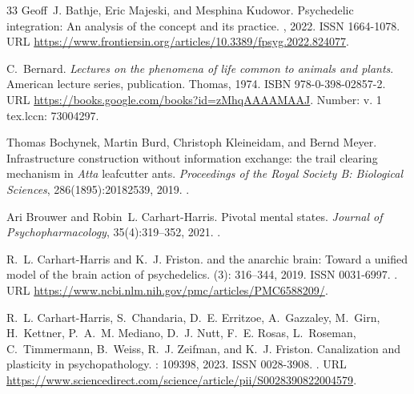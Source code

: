 \documentclass[12pt,fleqn]{article}
\begin{document}
\begin{thebibliography}{33}
  Geoff~J. Bathje, Eric Majeski, and Mesphina Kudowor.
  \newblock Psychedelic integration: An analysis of the concept and its practice.
  , 2022.
  \newblock ISSN 1664-1078.
  \newblock URL
  \url{https://www.frontiersin.org/articles/10.3389/fpsyg.2022.824077}.

  C.~Bernard.
  \newblock \emph{Lectures on the phenomena of life common to animals and
    plants}.
  \newblock American lecture series, publication. Thomas, 1974.
  \newblock ISBN 978-0-398-02857-2.
  \newblock URL \url{https://books.google.com/books?id=zMhqAAAAMAAJ}.
  \newblock Number: v. 1 tex.lccn: 73004297.

  Thomas Bochynek, Martin Burd, Christoph Kleineidam, and Bernd Meyer.
  \newblock Infrastructure construction without information exchange: the trail
  clearing mechanism in \emph{Atta} leafcutter ants.
  \newblock \emph{Proceedings of the Royal Society B: Biological Sciences},
  286(1895):20182539, 2019.
  \newblock {}.

  Ari Brouwer and Robin~L. Carhart-Harris.
  \newblock Pivotal mental states.
  \newblock \emph{Journal of Psychopharmacology}, 35(4):319--352, 2021.
  \newblock {}.

  R.~L. Carhart-Harris and K.~J. Friston.
   and the anarchic brain: Toward a unified model of the brain
  action of psychedelics.
   (3): 316--344, 2019.
  \newblock ISSN 0031-6997.
  \newblock {}.
  \newblock URL \url{https://www.ncbi.nlm.nih.gov/pmc/articles/PMC6588209/}.

  R.~L. Carhart-Harris, S.~Chandaria, D.~E. Erritzoe, A.~Gazzaley, M.~Girn,
  H.~Kettner, P.~A.~M. Mediano, D.~J. Nutt, F.~E. Rosas, L.~Roseman,
  C.~Timmermann, B.~Weiss, R.~J. Zeifman, and K.~J. Friston.
  \newblock Canalization and plasticity in psychopathology.
  : 109398, 2023.
  \newblock ISSN 0028-3908.
  \newblock {}.
  \newblock URL
  \url{https://www.sciencedirect.com/science/article/pii/S0028390822004579}.


\end{thebibliography}
\end{document}
